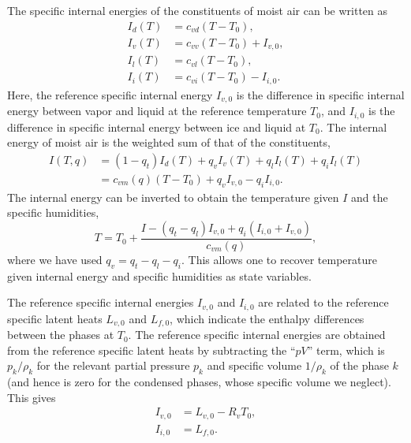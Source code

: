 \documentclass{report}
\begin{document}
The specific internal energies of the constituents of moist air can be written as
\begin{subequations}\label{e:internal_energies}
\begin{align}
I_d(T) & = c_{vd} (T - T_0),  \\
I_v(T) & = c_{vv} (T - T_0) + I_{v,0},\\
I_l(T) & = c_{vl} (T - T_0), \\
I_i(T) & = c_{vi} (T - T_0) - I_{i,0}.
\end{align}
\end{subequations}
Here, the reference specific internal energy $I_{v,0}$ is the difference in specific internal energy between vapor and liquid at the reference temperature $T_0$, and $I_{i,0}$ is the difference in specific internal energy between ice and liquid at $T_0$. The internal energy of moist air is the weighted sum of that of the constituents,
\begin{equation}
\begin{split}
     I(T, q) & = (1-q_t) I_d(T) + q_v I_v(T) + q_l I_l(T) + q_i I_l(T)\\
          & = c_{vm}(q) (T - T_0)  + q_v I_{v,0} - q_i I_{i,0}.
     \label{eq:total_internal_energy}
\end{split}
\end{equation}
The internal energy can be inverted to obtain the temperature given $I$ and the specific humidities,
\begin{equation}
    T = T_0 + \frac{I - (q_t - q_l) I_{v,0} + q_i (I_{i,0} + I_{v,0})}{c_{vm}(q)},
    \label{eq:temperature}
\end{equation}
where we have used $q_v = q_t - q_l - q_i$. This allows one to recover temperature given internal energy and specific humidities as state variables.

The reference specific internal energies $I_{v,0}$ and $I_{i,0}$ are related to the reference specific latent heats $L_{v,0}$ and $L_{f,0}$, which indicate the enthalpy differences between the phases at $T_0$. The reference specific internal energies are obtained from the reference specific latent heats by subtracting the ``$pV$'' term, which is $p_k/\rho_k$ for the relevant partial pressure $p_k$ and specific volume $1/\rho_k$ of the phase $k$ (and hence is zero for the condensed phases, whose specific volume we neglect). This gives
\begin{subequations}\label{e:ref_internal_energies}
\begin{align}
     I_{v,0} &= L_{v, 0} - R_v T_0,\\
     I_{i,0} &= L_{f, 0}.
\end{align}
\end{subequations}
   
\end{document}
